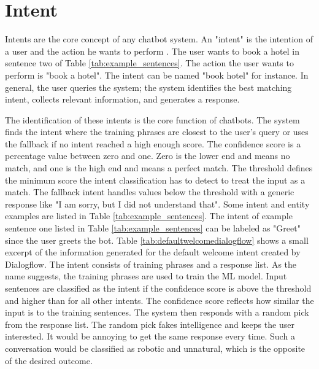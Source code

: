 \section{Intent} \label{sec:intent}
Intents are the core concept of any chatbot system.
An "intent" is the intention of a user and the action he wants to perform \cite{dutta2017developing, rahman2017programming}.
The user wants to book a hotel in sentence two of Table \ref{tab:example_sentences}.
The action the user wants to perform is "book a hotel".
The intent can be named "book hotel" for instance.
In general, the user queries the system; the system identifies the best matching intent, collects relevant information, and generates a response.

The identification of these intents is the core function of chatbots.
The system finds the intent where the training phrases are closest to the user's query or uses the fallback if no intent reached a high enough score.
The confidence score is a percentage value between zero and one.
Zero is the lower end and means no match, and one is the high end and means a perfect match.
The threshold defines the minimum score the intent classification has to detect to treat the input as a match.
The fallback intent handles values below the threshold with a generic response like "I am sorry, but I did not understand that".
Some intent and entity examples are listed in Table \ref{tab:example_sentences}.
The intent of example sentence one listed in Table \ref{tab:example_sentences} can be labeled as "Greet" since the user greets the bot.
Table \ref{tab:defaultwelcomedialogflow} shows a small excerpt of the information generated for the default welcome intent created by Dialogflow.
The intent consists of training phrases and a response list.
As the name suggests, the training phrases are used to train the ML model.
Input sentences are classified as the intent if the confidence score is above the threshold and higher than for all other intents.
The confidence score reflects how similar the input is to the training sentences.
The system then responds with a random pick from the response list.
The random pick fakes intelligence and keeps the user interested.
It would be annoying to get the same response every time.
Such a conversation would be classified as robotic and unnatural, which is the opposite of the desired outcome.

